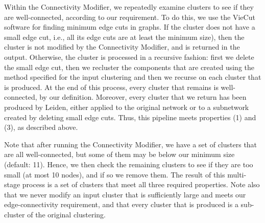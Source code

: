 \documentclass[11pt]{article}   	%
\begin{document}
Within the Connectivity Modifier, we repeatedly examine clusters to see if they are well-connected, according to our requirement.
To do this, we use the VieCut \citep{Henzinger2018,Henzinger2019}  software for finding minimum edge cuts in graphs.
If the cluster does not have a small edge cut, i.e., all its edge cuts are at least the minimum size), then the cluster is not modified by the Connectivity Modifier,
and is returned in the output.
Otherwise, the cluster is processed in a recursive fashion: first we delete the small edge cut, then we recluster the components that are created using the method specified for the input clustering
and then we recurse on each cluster that is produced. At the end of this process, every cluster that remains is well-connected, by our definition.
Moreover, every cluster that we return has been produced by Leiden, either applied to the original network or to a subnetwork created by deleting small edge cuts.
Thus, this pipeline meets properties (1) and (3), as  described above.

Note that after running the Connectivity Modifier, we have a set of clusters that are all well-connected, but some of them may be below our minimum size (default: 11).
Hence, we then check the remaining clusters to see if they are too small (at most 10 nodes), and if so we remove them.
The result of this multi-stage process is a set of clusters that meet all three required properties.
Note also that we never modify an input cluster that is sufficiently large
and meets our edge-connectivity requirement, and that every cluster that is produced is a sub-cluster of the original clustering.
\end{document}
